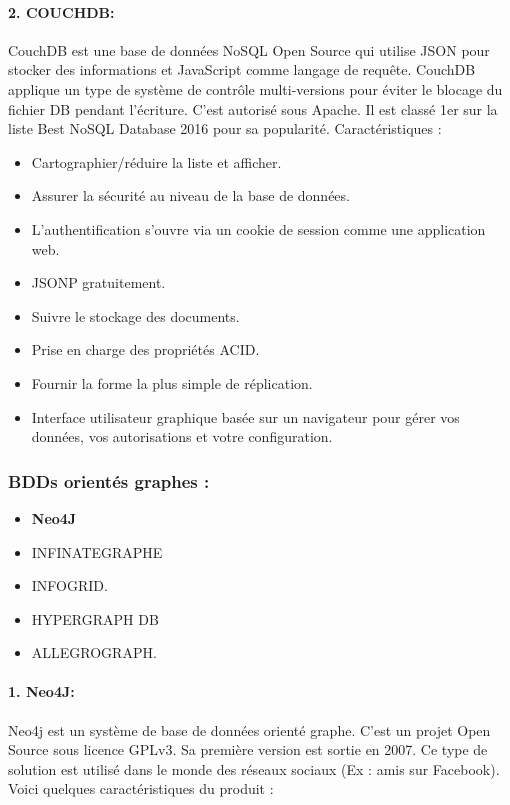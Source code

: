 \paragraph{2. COUCHDB:}
CouchDB est une base de données NoSQL Open Source qui utilise JSON pour stocker des informations et JavaScript comme langage de requête. CouchDB applique un type de système de contrôle multi-versions pour éviter le blocage du fichier DB pendant l'écriture. C'est autorisé sous Apache. Il est classé 1er sur la liste Best NoSQL Database 2016 pour sa popularité.
Caractéristiques :

\begin{itemize}[label=]
\item Cartographier/réduire la liste et afficher.
\item Assurer la sécurité au niveau de la base de données.
\item L'authentification s'ouvre via un cookie de session comme une application web.
\item JSONP gratuitement.
\item Suivre le stockage des documents.
\item Prise en charge des propriétés ACID.
\item Fournir la forme la plus simple de réplication.
\item Interface utilisateur graphique basée sur un navigateur pour gérer vos données, vos autorisations et votre configuration.
\end{itemize}

\subsubsection{BDDs orientés graphes :}
\begin{itemize}[label=\textbullet]
\item \textbf{Neo4J}
\item INFINATEGRAPHE
\item INFOGRID.
\item HYPERGRAPH DB
\item ALLEGROGRAPH.
\end{itemize}

\paragraph{1. Neo4J:}
Neo4j est un système de base de données orienté graphe. C’est un projet Open Source sous licence GPLv3. Sa première version est sortie en 2007. Ce type de solution est utilisé dans le monde des réseaux sociaux (Ex : amis sur Facebook). Voici quelques caractéristiques du produit :

